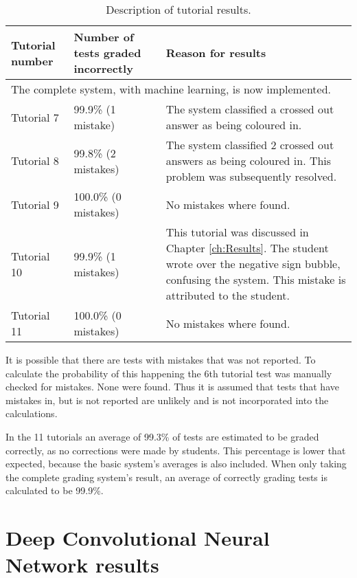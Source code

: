 \begin{table}
\caption{Description of tutorial results.} \label{tbl:tutResults2}
  \centering
\begin{tabular}{|p{2cm}|p{4cm}|p{5cm}|}
\hline
\textbf{Tutorial number}&\textbf{Number of tests graded incorrectly}&\textbf{Reason for results}\\
\hline
\multicolumn{3}{|l|}{The complete system,  with machine learning, is now implemented.}\\
\hline
Tutorial 7&99.9\% (1 mistake)&The system classified a crossed out answer as being coloured in.\\
\hline
Tutorial 8&99.8\% (2 mistakes)&The system classified 2 crossed out answers as being coloured in. This problem was subsequently resolved.\\
\hline
Tutorial 9&100.0\% (0 mistakes)&No mistakes where found.\\
\hline
Tutorial 10&99.9\% (1 mistakes)&This tutorial was discussed in Chapter \ref{ch:Results}. The student wrote over the negative sign bubble, confusing the system. This mistake is attributed to the student.\\
\hline
Tutorial 11&100.0\% (0 mistakes)&No mistakes where found.\\
\hline
\end{tabular}
\end{table}

It is possible that there are tests with mistakes that was not reported. To calculate the probability of this happening the 6th tutorial test was manually checked for mistakes. None were found. Thus it is assumed that tests that have mistakes in, but is not reported are unlikely and is not incorporated into the calculations.

In the 11 tutorials an average of 99.3\% of tests are estimated to be graded correctly, as no corrections were made by students.  This percentage is lower that expected, because the basic system's averages is also included. When only taking the complete grading system's result, an average of correctly grading tests is calculated to be 99.9\%.


\section{Deep Convolutional Neural Network results}
\label{sec:DCNNresult}

